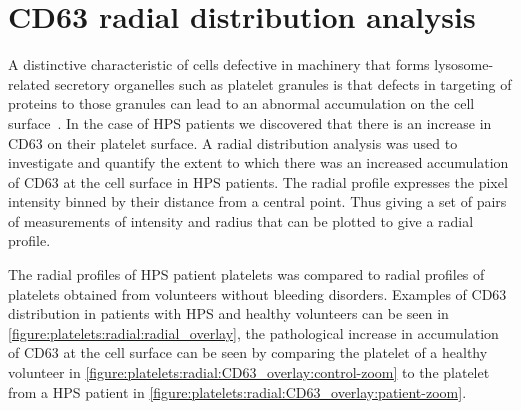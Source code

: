 \section{CD63 radial distribution analysis}
\label{platelets:image_processing:radial}
A distinctive characteristic of cells defective in machinery that forms lysosome-related secretory organelles such as platelet granules is that defects in targeting of proteins to those granules can lead to an abnormal accumulation on the cell surface~\cite{DellAngelica1999}. In the case of HPS patients we discovered that there is an increase in CD63 on their platelet surface. A radial distribution analysis was used to investigate and quantify the extent to which there was an increased accumulation of CD63 at the cell surface in HPS patients. The radial profile expresses the pixel intensity binned by their distance from a central point. Thus giving a set of pairs of measurements of intensity and radius that can be plotted to give a radial profile.

The radial profiles of HPS patient platelets was compared to radial profiles of platelets obtained from volunteers without bleeding disorders. Examples of CD63 distribution in patients with HPS and healthy volunteers can be seen in \autoref{figure:platelets:radial:radial_overlay}, the pathological increase in accumulation of CD63 at the cell surface can be seen by comparing the platelet of a healthy volunteer in \autoref{figure:platelets:radial:CD63_overlay:control-zoom} to the platelet from a HPS patient in \autoref{figure:platelets:radial:CD63_overlay:patient-zoom}.

